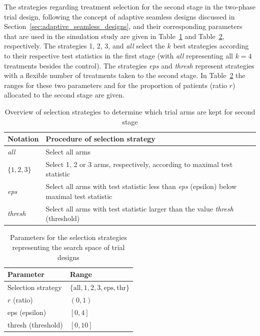 \documentclass[bimj,fleqn]{w-art}
\theoremstyle{plain}
\theoremstyle{definition}
\begin{document}
The strategies regarding treatment selection for the second stage in the two-phase trial design, following the concept of adaptive seamless designs discussed in Section~\ref{sec:adaptive_seamless_designs}, and their corresponding parameters that are used in the simulation study are given in Table~\ref{tab:selection_strategies} and Table~\ref{tab:search_space}, respectively.
The strategies 1, 2, 3, and \emph{all} select the $k$ best strategies according to their respective test statistics in the first stage (with \emph{all} representing all $k=4$ treatments besides the control). The strategies \emph{eps} and \emph{thresh} represent strategies with a flexible number of treatments taken to the second stage. In Table~\ref{tab:search_space} the ranges for these two parameters and for the proportion of patients (ratio $r$) allocated to the second stage are given.
\begin{table}[h]
  \caption{Overview of selection strategies to determine which trial arms are kept for second stage}
  \label{tab:selection_strategies}
  \centering
  \begin{tabular}{ll}
  \hline
  Notation & Procedure of selection strategy  \\
  \hline
  \emph{all}     & Select all arms  \\
  $\{1,2,3\}$    & Select 1, 2 or 3 arms, respectively, according to maximal test statistic \\
  \emph{eps}     & Select all arms with test statistic less than \emph{eps} (epsilon) below maximal test statistic \\
  \emph{thresh}     & Select all arms with test statistic larger than the value \emph{thresh} (threshold) \\
  \hline
  \end{tabular}
\end{table}
\begin{table}[h]
  \caption{Parameters for the selection strategies representing the search space of trial designs}
  \label{tab:search_space}
  \centering
  \begin{tabular}{ll}
  \hline
  Parameter         & Range \\
  \hline
  Selection strategy & $\{\text{all}, 1, 2, 3, \text{eps}, \text{thr} \}$ \\
  $r$ (ratio)        & $(0,1)$ \\
  eps (epsilon)            & $[0,4]$ \\
  thresh (threshold)          & $[0,10]$ \\
  \hline
  \end{tabular}
\end{table}
\end{document}
